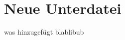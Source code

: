 \documentclass[main.tex]{subfiles} %
\begin{document}

\section{Neue Unterdatei}

was hinzugefügt blablibub
\end{document}

